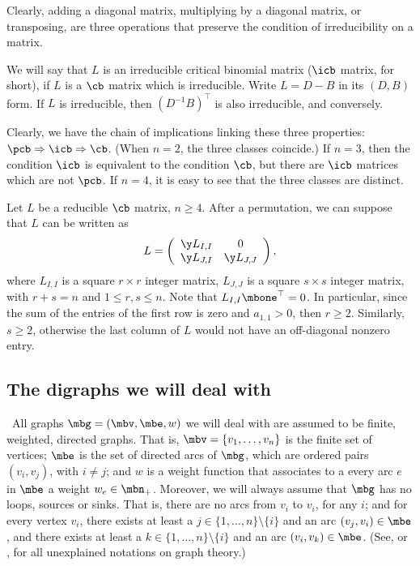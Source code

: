 Clearly, adding a diagonal matrix, multiplying by a diagonal matrix,
or transposing, are three operations that preserve the condition of
irreducibility on a matrix.

We will say that $L$ is an irreducible critical binomial matrix
($\icb$ matrix, for short), if $L$ is a $\cb$ matrix which is
irreducible. Write $L=D-B$ in its $(D,B)$ form. If $L$ is irreducible,
then $(D^{-1}B)^{\top}$ is also irreducible, and conversely.

Clearly, we have the chain of implications linking these three
properties: $\pcb\Rightarrow\icb\Rightarrow\cb$. (When $n=2$, the
three classes coincide.) If $n=3$, then the condition $\icb$ is
equivalent to the condition $\cb$, but there are $\icb$ matrices which
are not $\pcb$. If $n=4$, it is easy to see that the three classes are
distinct.

\begin{remark}\label{remarkreducedform}
Let $L$ be a reducible $\cb$ matrix, $n\geq 4$. After a permutation,
we can suppose that $L$ can be written as
\begin{eqnarray}\label{eqreducedform}
L=\left(\begin{array}{cc} 
\y L_{I,I}&0\\
\y L_{J,I}&\y L_{J,J}
\end{array}\right),
\end{eqnarray}
where $L_{I,I}$ is a square $r\times r$ integer matrix, $L_{J,J}$ is a
square $s\times s$ integer matrix, with $r+s=n$ and $1\leq r,s\leq n$.
Note that $L_{I,I}\mbone^{\top}=0$. In particular, since the sum of
the entries of the first row is zero and $a_{1,1}>0$, then $r\geq
2$. Similarly, $s\geq 2$, otherwise the last column of $L$ would not
have an off-diagonal nonzero entry.
\end{remark}

\subsection{The digraphs we will deal with}

\ All graphs $\mbg=(\mbv,\mbe,w)$ we will deal with are
assumed to be finite, weighted, directed graphs. That is,
$\mbv=\{v_1,\ldots ,v_n\}$ is the finite set of vertices; $\mbe$ is
the set of directed arcs of $\mbg$, which are ordered pairs
$(v_i,v_j)$, with $i\neq j$; and $w$ is a weight function that
associates to a every arc $e$ in $\mbe$ a weight
$w_e\in\mbn_+$. Moreover, we will always assume that $\mbg$ has no
loops, sources or sinks. That is, there are no arcs from $v_i$ to
$v_i$, for any $i$; and for every vertex $v_i$, there exists at least
a $j\in\{1,\ldots,n\}\setminus\{i\}$ and an arc $(v_j,v_i)\in \mbe$,
and there exists at least a $k\in\{1,\ldots,n\}\setminus\{i\}$ and an
arc $(v_i,v_k)\in \mbe$.  (See, \eg \cite{br} or \cite{gr}, for all
unexplained notations on graph theory.)

